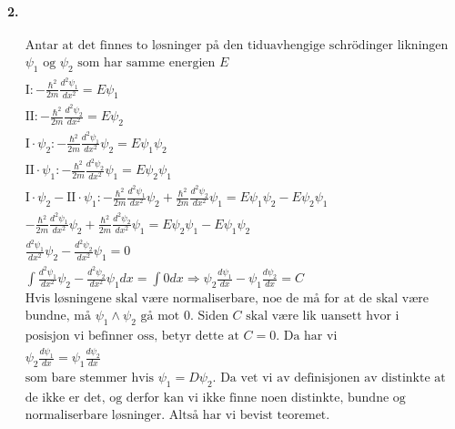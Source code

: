 \documentclass[11pt, A4paper,norsk]{article}
\begin{document}
		\paragraph{2.}
			\begin{gather*}
\text{Antar at det finnes to løsninger på den tiduavhengige schrödinger likningen} \\
\text{$\psi_1$ og $\psi_2$ som har samme energien $E$} \\
\text{I}: - \frac{\hbar^2}{2m} \frac{d^2 \psi_1}{dx^2} = E \psi_1 \\
\text{II}: - \frac{\hbar^2}{2m} \frac{d^2 \psi_2}{dx^2} = E \psi_2 \\
\text{I} \cdot \psi_2: - \frac{\hbar^2}{2m} \frac{d^2 \psi_1}{dx^2} \psi_2 = E \psi_1 \psi_2 \\
\text{II} \cdot \psi_1: - \frac{\hbar^2}{2m} \frac{d^2 \psi_2}{dx^2} \psi_1 = E \psi_2 \psi_1 \\
\text{I} \cdot \psi_2 - \text{II} \cdot \psi_1: - \frac{\hbar^2}{2m} \frac{d^2 \psi_1}{dx^2} \psi_2 + \frac{\hbar^2}{2m} \frac{d^2 \psi_2}{dx^2} \psi_1 = E \psi_1 \psi_2 - E \psi_2 \psi_1 \\
- \frac{\hbar^2}{2m} \frac{d^2 \psi_1}{dx^2} \psi_2 +  \frac{\hbar^2}{2m} \frac{d^2 \psi_2}{dx^2} \psi_1 = E \psi_2 \psi_1 - E \psi_1 \psi_2 \\
\frac{d^2 \psi_1}{dx^2} \psi_2 - \frac{d^2 \psi_2}{dx^2} \psi_1 = 0 \\
\int \frac{d^2 \psi_1}{dx^2} \psi_2 - \frac{d^2 \psi_2}{dx^2} \psi_1 dx = \int 0 dx \Rightarrow \psi_2 \frac{d \psi_1}{dx} - \psi_1 \frac{d \psi_2}{dx} = C \\
\text{Hvis løsningene skal være normaliserbare, noe de må for at de skal være} \\
\text{bundne, må $\psi_1 \wedge \psi_2$ gå mot $0$. Siden $C$ skal være lik uansett hvor i} \\
\text{posisjon vi befinner oss, betyr dette at $C = 0$. Da har vi} \\
\psi_2 \frac{d \psi_1}{dx} = \psi_1 \frac{d \psi_2}{dx} \\
\text{som bare stemmer hvis $\psi_1 = D \psi_2$. Da vet vi av definisjonen av distinkte at} \\
\text{de ikke er det, og derfor kan vi ikke finne noen distinkte, bundne og} \\
\text{normaliserbare løsninger. Altså har vi bevist teoremet.}
			\end{gather*}
\end{document}
